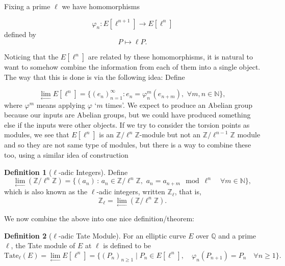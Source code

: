 \documentclass{article}
\theoremstyle{definition}
\newtheorem{definition}{Definition}[section]
\theoremstyle{definition}
\theoremstyle{definition}
\newcommand{\tate}{\operatorname{Tate_{\ell}}}
\newcommand{\Z}{\mathbb{Z}}
\newcommand{\N}{\mathbb{N}}
\begin{document}
Fixing a prime $\ell$ we have homomorphisms

$$\varphi_n:E[\ell^{n+1}]\to E[\ell^n]$$
defined by
$$P\mapsto \ell P.$$

Noticing that the $E[\ell^n]$ are related by these homomorphisms, it is natural to want to somehow combine the information from each of them into a single object. The way that this is done is via the following idea:
\newline\newline
Define

$$\lim_{\longleftarrow} E[\ell^n]=\{(e_n)_{n=1}^\infty: e_n=\varphi_n^m(e_{n+m}),\,\, \forall m,n\in\N \},$$%
where $\varphi^m$ means applying $\varphi$ `$m$ times'.
\newline\newline
We expect to produce an Abelian group because our inputs are Abelian groups, but we could have produced something else if the inputs were other objects.
\newline\newline
If we try to consider the torsion points as modules, we see that $E[\ell^n]$ is an $\Z/\ell^n\Z$-module but not an $\Z/\ell^{n-1}\Z$ module and so they are not same type of modules, but there is a way to combine these too, using a similar idea of construction

\begin{definition}[$\ell$-adic Integers] \label{l-adic Z} Define
    $$\lim_{\longleftarrow} (\Z/\ell^n\Z)=\{(a_n)\,:\, a_n\in\Z/\ell^n\Z, \,\, a_n=a_{n+m}\mod \ell^n \quad\forall m\in\N\},$$
which is also known as the $\ell$-adic integers, written $\Z_{\ell}$, that is,
$$\Z_\ell=\lim_{\longleftarrow} (\Z/\ell^n\Z).$$
\end{definition}



We now combine the above into one nice definition/theorem:


\begin{definition} [$\ell$-adic Tate Module]
    For an elliptic curve $E$ over $\mathbb{Q}$ and a prime $\ell$, the Tate module of $E$ at $\ell$ is defined to be
    $$\tate(E)=\lim_{\longleftarrow} E[\ell^n]=\{(P_n)_{n\geq1}\mid P_n\in E[\ell^n],\quad \varphi_n(P_{n+1})=P_n\quad
    \forall n\geq1\}.$$

    
\end{definition}
\end{document}

